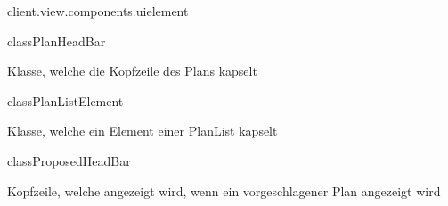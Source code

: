 \begin{texdocpackage}{client.view.components.uielement}
\begin{texdocclass}{class}{PlanHeadBar}
\label{texdoclet:edu.kit.informatik.studyplan.client.view.components.uielement.PlanHeadBar}
\begin{texdocclassintro}
Klasse, welche die Kopfzeile des Plans kapselt\end{texdocclassintro}
\begin{texdocclassfields}
\end{texdocclassfields}
\begin{texdocclassconstructors}
\end{texdocclassconstructors}
\begin{texdocclassmethods}
\end{texdocclassmethods}
\end{texdocclass}


\begin{texdocclass}{class}{PlanListElement}
\label{texdoclet:edu.kit.informatik.studyplan.client.view.components.uielement.PlanListElement}
\begin{texdocclassintro}
Klasse, welche ein Element einer PlanList kapselt\end{texdocclassintro}
\begin{texdocclassfields}
\end{texdocclassfields}
\begin{texdocclassconstructors}
\end{texdocclassconstructors}
\begin{texdocclassmethods}
\end{texdocclassmethods}
\end{texdocclass}


\begin{texdocclass}{class}{ProposedHeadBar}
\label{texdoclet:edu.kit.informatik.studyplan.client.view.components.uielement.ProposedHeadBar}
\begin{texdocclassintro}
Kopfzeile, welche angezeigt wird, wenn ein vorgeschlagener Plan angezeigt
 wird\end{texdocclassintro}
\begin{texdocclassconstructors}
\end{texdocclassconstructors}
\end{texdocclass}



\end{texdocpackage}
